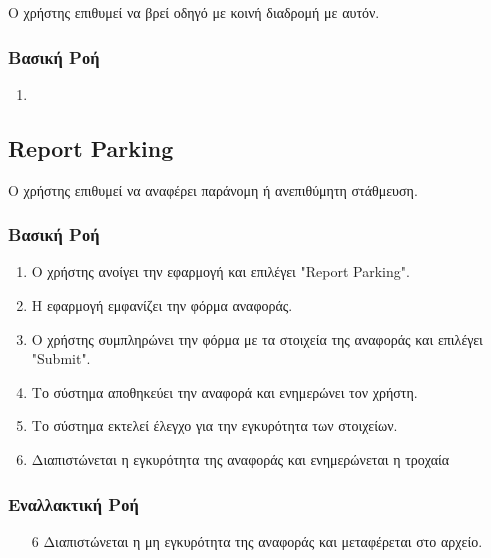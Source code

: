 \documentclass[11pt]{article}
\begin{document}
Ο χρήστης επιθυμεί να βρεί οδηγό με κοινή διαδρομή με αυτόν.

\subsubsection{Βασική Ροή}

\begin{enumerate}
    \item
\end{enumerate}



\subsection{Report Parking}

Ο χρήστης επιθυμεί να αναφέρει παράνομη ή ανεπιθύμητη στάθμευση.

\subsubsection{Βασική Ροή}

\begin{enumerate}
    \item Ο χρήστης ανοίγει την εφαρμογή και επιλέγει "Report Parking".
    \item Η εφαρμογή εμφανίζει την φόρμα αναφοράς.
    \item Ο χρήστης συμπληρώνει την φόρμα με τα στοιχεία της αναφοράς
          και επιλέγει "Submit".
    \item Το σύστημα αποθηκεύει την αναφορά και ενημερώνει τον χρήστη.
    \item Το σύστημα εκτελεί έλεγχο για την εγκυρότητα των στοιχείων.
    \item Διαπιστώνεται η εγκυρότητα της αναφοράς και ενημερώνεται η τροχαία
\end{enumerate}

\subsubsection{Εναλλακτική Ροή}

\begin{enumerate}
    \item[6] Διαπιστώνεται η μη εγκυρότητα της αναφοράς και μεταφέρεται στο αρχείο.
\end{enumerate}
\end{document}
